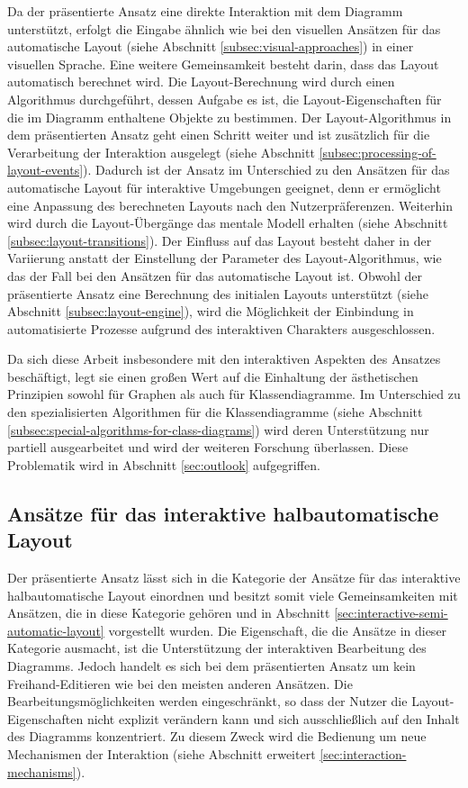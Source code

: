 Da der präsentierte Ansatz eine direkte Interaktion mit dem Diagramm unterstützt, erfolgt die Eingabe ähnlich wie bei den visuellen Ansätzen für das automatische Layout (siehe Abschnitt \ref{subsec:visual-approaches}) in einer visuellen Sprache. Eine weitere Gemeinsamkeit besteht darin, dass das Layout automatisch berechnet wird. Die Layout-Berechnung wird durch einen Algorithmus durchgeführt, dessen Aufgabe es ist, die Layout-Eigenschaften für die im Diagramm enthaltene Objekte zu bestimmen. Der Layout-Algorithmus in dem präsentierten Ansatz geht einen Schritt weiter und ist zusätzlich für die Verarbeitung der Interaktion ausgelegt (siehe Abschnitt \ref{subsec:processing-of-layout-events}). Dadurch ist der Ansatz im Unterschied zu den Ansätzen für das automatische Layout für interaktive Umgebungen geeignet, denn er ermöglicht eine Anpassung des berechneten Layouts nach den Nutzerpräferenzen. Weiterhin wird durch die Layout-Übergänge das mentale Modell erhalten (siehe Abschnitt \ref{subsec:layout-transitions}). Der Einfluss auf das Layout besteht daher in der Variierung anstatt der Einstellung der Parameter des Layout-Algorithmus, wie das der Fall bei den Ansätzen für das automatische Layout ist. Obwohl der präsentierte Ansatz eine Berechnung des initialen Layouts unterstützt (siehe Abschnitt \ref{subsec:layout-engine}), wird die Möglichkeit der Einbindung in automatisierte Prozesse aufgrund des interaktiven Charakters ausgeschlossen.

Da sich diese Arbeit insbesondere mit den interaktiven Aspekten des Ansatzes beschäftigt, legt sie einen großen Wert auf die Einhaltung der ästhetischen Prinzipien sowohl für Graphen als auch für Klassendiagramme. Im Unterschied zu den spezialisierten Algorithmen für die Klassendiagramme (siehe Abschnitt \ref{subsec:special-algorithms-for-class-diagrams}) wird deren Unterstützung nur partiell ausgearbeitet und wird der weiteren Forschung überlassen. Diese Problematik wird in Abschnitt \ref{sec:outlook} aufgegriffen.

\subsection{Ansätze für das interaktive halbautomatische Layout}
\label{subsec:comparison-interactive-layout}

Der präsentierte Ansatz lässt sich in die Kategorie der Ansätze für das interaktive halbautomatische Layout einordnen und besitzt somit viele Gemeinsamkeiten mit Ansätzen, die in diese Kategorie gehören und in Abschnitt \ref{sec:interactive-semi-automatic-layout} vorgestellt wurden. Die Eigenschaft, die die Ansätze in dieser Kategorie ausmacht, ist die Unterstützung der interaktiven Bearbeitung des Diagramms. Jedoch handelt es sich bei dem präsentierten Ansatz um kein Freihand-Editieren wie bei den meisten anderen Ansätzen. Die Bearbeitungsmöglichkeiten werden eingeschränkt, so dass der Nutzer die Layout-Eigenschaften nicht explizit verändern kann und sich ausschließlich auf den Inhalt des Diagramms konzentriert. Zu diesem Zweck wird die Bedienung um neue Mechanismen der Interaktion (siehe Abschnitt erweitert \ref{sec:interaction-mechanisms}).

